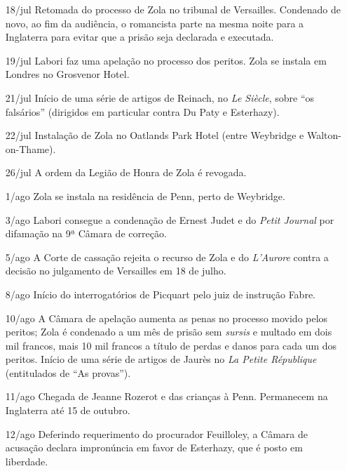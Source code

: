 \begin{itemize}
\item[18/jul] Retomada do processo de Zola no tribunal de Versailles. Condenado
de novo, ao fim da audiência, o romancista parte na mesma noite para a
Inglaterra para evitar que a prisão seja declarada e executada.

\item[19/jul] Labori faz uma apelação no processo dos peritos. Zola se instala
em Londres no Grosvenor Hotel. 

\item[21/jul] Início de uma série de artigos de Reinach, no \textit{Le Siècle},
sobre ``os falsários'' (dirigidos em particular contra Du Paty e Esterhazy).

\item[22/jul] Instalação de Zola no Oatlands Park Hotel (entre Weybridge e
Walton-on-Thame).

\item[26/jul] A ordem da Legião de Honra de Zola é revogada. 

\item[1/ago] Zola se instala na residência de Penn, perto de Weybridge.

\item[3/ago] Labori consegue a condenação de Ernest Judet e do \textit{Petit
Journal} por difamação na 9ª Câmara de correção.

\item[5/ago] A Corte de cassação rejeita o recurso de Zola e do
\textit{L'Aurore } contra a decisão no julgamento de Versailles em 18 de julho. 

\item[8/ago] Início do interrogatórios de Picquart pelo juiz de instrução
Fabre.

\item[10/ago] A Câmara de apelação aumenta as penas no processo movido pelos
peritos; Zola é condenado a um mês de prisão sem \textit{sursis} e multado em
dois mil francos, mais 10 mil francos a título de perdas e danos para cada um
dos peritos. Início de uma série de artigos de Jaurès no \textit{La Petite
République} (entitulados de ``As provas'').   

\item[11/ago] Chegada de Jeanne Rozerot e das crianças à Penn. Permanecem na
Inglaterra até 15 de outubro.

\item[12/ago] Deferindo requerimento do procurador Feuilloley, a Câmara de
acusação declara impronúncia em favor de Esterhazy, que é posto em liberdade. 


\end{itemize}
